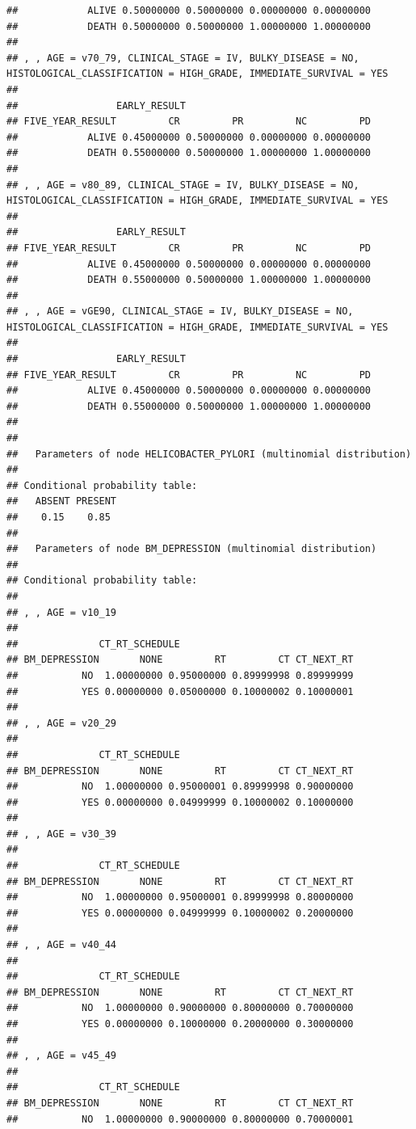 \documentclass[]{article}
\begin{document}
\begin{verbatim}
##            ALIVE 0.50000000 0.50000000 0.00000000 0.00000000
##            DEATH 0.50000000 0.50000000 1.00000000 1.00000000
## 
## , , AGE = v70_79, CLINICAL_STAGE = IV, BULKY_DISEASE = NO, HISTOLOGICAL_CLASSIFICATION = HIGH_GRADE, IMMEDIATE_SURVIVAL = YES
## 
##                 EARLY_RESULT
## FIVE_YEAR_RESULT         CR         PR         NC         PD
##            ALIVE 0.45000000 0.50000000 0.00000000 0.00000000
##            DEATH 0.55000000 0.50000000 1.00000000 1.00000000
## 
## , , AGE = v80_89, CLINICAL_STAGE = IV, BULKY_DISEASE = NO, HISTOLOGICAL_CLASSIFICATION = HIGH_GRADE, IMMEDIATE_SURVIVAL = YES
## 
##                 EARLY_RESULT
## FIVE_YEAR_RESULT         CR         PR         NC         PD
##            ALIVE 0.45000000 0.50000000 0.00000000 0.00000000
##            DEATH 0.55000000 0.50000000 1.00000000 1.00000000
## 
## , , AGE = vGE90, CLINICAL_STAGE = IV, BULKY_DISEASE = NO, HISTOLOGICAL_CLASSIFICATION = HIGH_GRADE, IMMEDIATE_SURVIVAL = YES
## 
##                 EARLY_RESULT
## FIVE_YEAR_RESULT         CR         PR         NC         PD
##            ALIVE 0.45000000 0.50000000 0.00000000 0.00000000
##            DEATH 0.55000000 0.50000000 1.00000000 1.00000000
## 
## 
##   Parameters of node HELICOBACTER_PYLORI (multinomial distribution)
## 
## Conditional probability table:
##   ABSENT PRESENT 
##    0.15    0.85 
## 
##   Parameters of node BM_DEPRESSION (multinomial distribution)
## 
## Conditional probability table:
##  
## , , AGE = v10_19
## 
##              CT_RT_SCHEDULE
## BM_DEPRESSION       NONE         RT         CT CT_NEXT_RT
##           NO  1.00000000 0.95000000 0.89999998 0.89999999
##           YES 0.00000000 0.05000000 0.10000002 0.10000001
## 
## , , AGE = v20_29
## 
##              CT_RT_SCHEDULE
## BM_DEPRESSION       NONE         RT         CT CT_NEXT_RT
##           NO  1.00000000 0.95000001 0.89999998 0.90000000
##           YES 0.00000000 0.04999999 0.10000002 0.10000000
## 
## , , AGE = v30_39
## 
##              CT_RT_SCHEDULE
## BM_DEPRESSION       NONE         RT         CT CT_NEXT_RT
##           NO  1.00000000 0.95000001 0.89999998 0.80000000
##           YES 0.00000000 0.04999999 0.10000002 0.20000000
## 
## , , AGE = v40_44
## 
##              CT_RT_SCHEDULE
## BM_DEPRESSION       NONE         RT         CT CT_NEXT_RT
##           NO  1.00000000 0.90000000 0.80000000 0.70000000
##           YES 0.00000000 0.10000000 0.20000000 0.30000000
## 
## , , AGE = v45_49
## 
##              CT_RT_SCHEDULE
## BM_DEPRESSION       NONE         RT         CT CT_NEXT_RT
##           NO  1.00000000 0.90000000 0.80000000 0.70000001

\end{verbatim}
\end{document}
